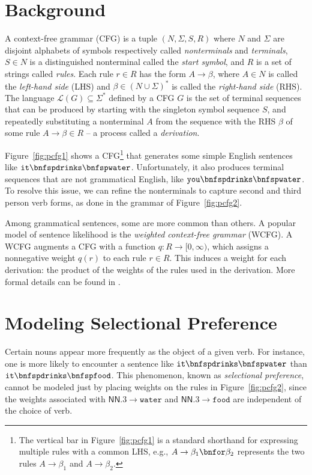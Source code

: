 \documentclass[11pt,a4paper]{article}
\renewcommand{\bnfpn}[1]{\mathsf{#1}}
\renewcommand{\bnfpo}{\rightarrow}
\renewcommand{\bnfts}[1]{\mathtt{#1}}
\begin{document}
\section{Background}

A context-free grammar (CFG) is a tuple $(N,\Sigma,S,R)$ where $N$ and $\Sigma$ are disjoint alphabets of symbols respectively called \emph{nonterminals} and \emph{terminals}, $S \in N$ is a distinguished nonterminal called the \emph{start symbol}, and $R$ is a set of strings called \emph{rules}. Each rule $r \in R$ has the form $A \bnfpo \beta$, where $A \in N$ is called the \emph{left-hand side} (LHS) and $\beta \in (N \cup \Sigma)^*$ is called the \emph{right-hand side} (RHS). The language $\mathcal{L}(G) \subseteq \Sigma^*$ defined by a CFG $G$ is the set of terminal sequences that can be produced by starting with the singleton symbol sequence $S$, and repeatedly substituting a nonterminal $A$ from the sequence with the RHS $\beta$ of some rule $A \bnfpo \beta \in R$ -- a process called a \emph{derivation}.

Figure~\ref{fig:pcfg1} shows a CFG\footnote{The vertical bar in Figure~\ref{fig:pcfg1} is a standard shorthand for expressing multiple rules with a common LHS, e.g., $A \bnfpo \beta_1 \bnfor \beta_2$ represents the two rules $A \bnfpo \beta_1$ and $A \bnfpo \beta_2$.} that generates some simple English sentences like $\bnfts{it} \bnfsp \bnfts{drinks} \bnfsp \bnfts{water}$. Unfortunately, it also produces terminal sequences that are not grammatical English, like $\bnfts{you} \bnfsp \bnfts{drinks} \bnfsp \bnfts{water}$. To resolve this issue, we can refine the nonterminals to capture second and third person verb forms, as done in the grammar of Figure~\ref{fig:pcfg2}.


Among grammatical sentences, some are more common than others. A popular model of sentence likelihood is the \emph{weighted context-free grammar} (WCFG). A WCFG augments a CFG with a function $q: R \rightarrow [0,\infty)$, which assigns a nonnegative weight $q(r)$ to each rule $r \in R$. This induces a weight for each derivation: the product of the weights of the rules used in the derivation. More formal details can be found in \citet{collins2013lexicalized}. 



\section{Modeling Selectional Preference}

Certain nouns appear more frequently as the object of a given verb. For instance, one is more likely to encounter a sentence like $\bnfts{it} \bnfsp \bnfts{drinks} \bnfsp \bnfts{water}$ than $\bnfts{it} \bnfsp \bnfts{drinks} \bnfsp \bnfts{food}$. This phenomenon, known as \emph{selectional preference}, cannot be modeled just by placing weights on the rules in Figure~\ref{fig:pcfg2}, since the weights associated with $\bnfpn{NN.3} \bnfpo \bnfts{water}$ and $\bnfpn{NN.3} \bnfpo \bnfts{food}$ are independent of the choice of verb.
\end{document}
